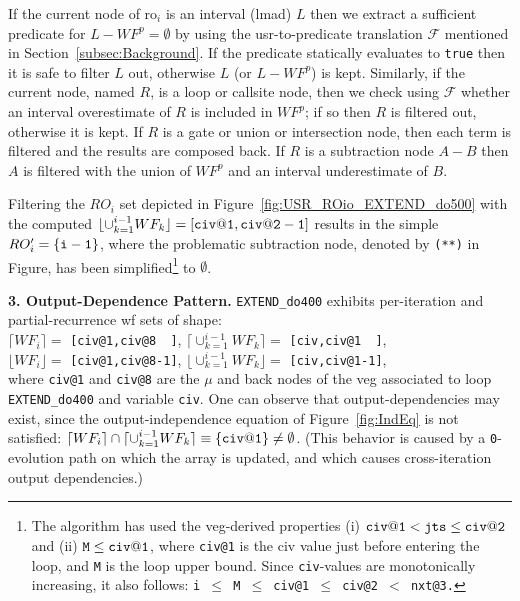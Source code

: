 \documentclass{sig-alternate}
\begin{document}
If the current node of {\sc ro}$_i$ is an interval ({\sc lmad}) $L$ then we extract a 
sufficient predicate for $L - WF^p = \emptyset$ by using the {\sc usr}-to-predicate
translation $\mathcal{F}$ mentioned in Section~\ref{subsec:Background}.   
If the predicate statically evaluates to {\tt true} then it is safe to 
filter $L$ out, otherwise $L$ (or $L-WF^p$) is kept.  
%
Similarly, if the current node, named $R$, is a loop or callsite node, 
then we check using $\mathcal{F}$ whether an interval overestimate of 
$R$ is included in $WF^p$; if so then $R$ is filtered out, otherwise 
it is kept.  
%
If $R$ is a gate or union or intersection node,
then each term is filtered and the results are composed back. 
%
If $R$ is a subtraction node $A-B$ then $A$ is filtered with the union 
of $WF^p$ and an interval underestimate of $B$. 

Filtering the $RO_{i}$ set depicted in Figure~\ref{fig:USR_ROio_EXTEND_do500}
with the computed $\lfloor \cup_{k=1}^{i-1}WF_k\rfloor={\tt [civ@1,civ@2-1]}$
results in the simple $RO'_{i} = {\tt\{i-1\}}$, where the problematic 
subtraction node, denoted by {\tt (**)} in Figure, has been simplified\footnote{
The algorithm has used the {\sc veg}-derived properties (i) ${\tt civ@1} < {\tt jts} \leq {\tt civ@2}$ 
and (ii) ${\tt M} \leq {\tt civ@1}$, where {\tt civ@1} is the {\sc civ} value 
just before entering the loop, and {\tt M} is the loop upper bound. Since 
{\tt civ}-values are monotonically increasing, it also follows: 
{\tt i $\leq$ M $\leq$ civ@1 $\leq$ civ@2 $<$ nxt@3.}
}
to $\emptyset$.%


\vspace{1ex}

{\bf 3. Output-Dependence Pattern.} 
%
{\tt EXTEND\_do400} exhibits per-iteration and partial-recurrence {\sc wf} 
sets of shape:\\
\noindent$\lceil WF_i\rceil = $ {\tt[civ@1,civ@8~~]},
$\lceil\cup_{k=1}^{i-1}WF_{k} \rceil = $ {\tt[civ,civ@1~~]},\\
\noindent$\lfloor WF_i\rfloor = $ {\tt[civ@1,civ@8-1]},
$\lfloor\cup_{k=1}^{i-1}WF_k \rfloor = $ {\tt[civ,civ@1-1]},\\
where {\tt civ@1} and {\tt civ@8} are the $\mu$ and back nodes of
the {\sc veg} associated to loop {\tt EXTEND\_do400} and variable {\tt civ}.
%
One can observe that output-dependencies may exist, since
the output-independence equation of Figure~\ref{fig:IndEq} is not satisfied:
$\lceil WF_{i}\rceil \cap \lceil \cup_{k=1}^{i-1}WF_{k} \rceil \equiv {\tt\{civ@1\}}\ne\emptyset$.
(This behavior is caused by a {\tt 0}-evolution path on which the array is updated,
and which causes cross-iteration output dependencies.)
\end{document}
